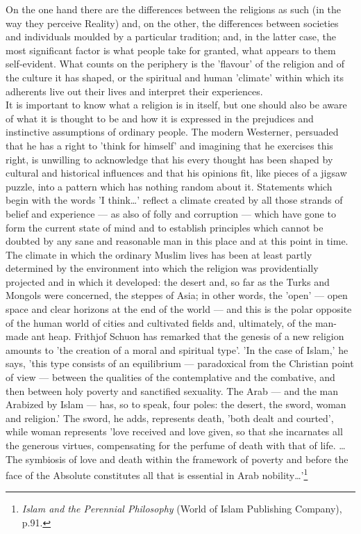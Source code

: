 \documentclass[10pt, twoside]{book}
\begin{document}
On the one hand there are the differences between the religions as such (in the way they perceive Reality) and, on the other, the differences between societies and individuals moulded by a particular tradition; and, in the latter case, the most significant factor is what people take for granted, what appears to them self\hyp{}evident. What counts on the periphery is the 'flavour' of the religion and of the culture it has shaped, or the spiritual and human 'climate' within which its adherents live out their lives and interpret their experiences. \\

It is important to know what a religion is in itself, but one should also be aware of what it is thought to be and how it is expressed in the prejudices and instinctive assumptions of ordinary people. The modern Westerner, persuaded that he has a right to 'think for himself' and imagining that he exercises this right, is unwilling to acknowledge that his every thought has been shaped by cultural and historical influences and that his opinions fit, like pieces of a jigsaw puzzle, into a pattern which has nothing random about it. Statements which begin with the words 'I think\ldots{}' reflect a climate created by all those strands of belief and experience --- as also of folly and corruption --- which have gone to form the current state of mind and to establish principles which cannot be doubted by any sane and reasonable man in this place and at this point in time. \\

The climate in which the ordinary Muslim lives has been at least partly determined by the environment into which the religion was providentially projected and in which it developed: the desert and, so far as the Turks and Mongols were concerned, the steppes of Asia; in other words, the 'open' --- open space and clear horizons at the end of the world --- and this is the polar opposite of the human world of cities and cultivated fields and, ultimately, of the man\hyp{}made ant heap. Frithjof Schuon has remarked that the genesis of a new religion amounts to 'the creation of a moral and spiritual type'. 'In the case of Islam,' he says, 'this type consists of an equilibrium --- paradoxical from the Christian point of view --- between the qualities of the contemplative and the combative, and then between holy poverty and sanctified sexuality. The Arab --- and the man Arabized by Islam --- has, so to speak, four poles: the desert, the sword, woman and religion.' The sword, he adds, represents death, 'both dealt and courted', while woman represents 'love received and love given, so that she incarnates all the generous virtues, compensating for the perfume of death with that of life. \ldots{} The symbiosis of love and death within the framework of poverty and before the face of the Absolute constitutes all that is essential in Arab nobility\ldots{}'\footnote{\emph{Islam and the Perennial Philosophy} (World of Islam Publishing Company), p.91.}\\
\end{document}
